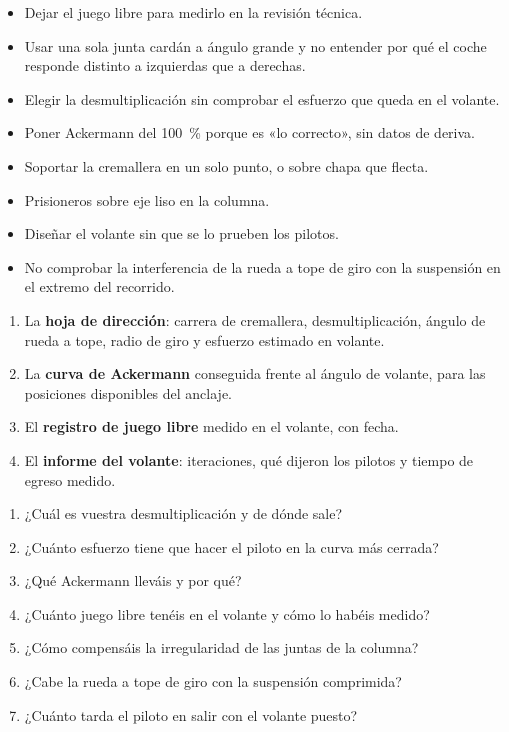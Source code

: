 \begin{ojo}
\begin{itemize}
  \item Dejar el juego libre para medirlo en la revisión técnica.
  \item Usar una sola junta cardán a ángulo grande y no entender por qué el
        coche responde distinto a izquierdas que a derechas.
  \item Elegir la desmultiplicación sin comprobar el esfuerzo que queda en el
        volante.
  \item Poner Ackermann del \SI{100}{\percent} porque es «lo correcto», sin
        datos de deriva.
  \item Soportar la cremallera en un solo punto, o sobre chapa que flecta.
  \item Prisioneros sobre eje liso en la columna.
  \item Diseñar el volante sin que se lo prueben los pilotos.
  \item No comprobar la interferencia de la rueda a tope de giro con la
        suspensión en el extremo del recorrido.
\end{itemize}
\end{ojo}

\begin{entregable}
\begin{enumerate}
  \item La \textbf{hoja de dirección}: carrera de cremallera, desmultiplicación,
        ángulo de rueda a tope, radio de giro y esfuerzo estimado en volante.
  \item La \textbf{curva de Ackermann} conseguida frente al ángulo de volante,
        para las posiciones disponibles del anclaje.
  \item El \textbf{registro de juego libre} medido en el volante, con fecha.
  \item El \textbf{informe del volante}: iteraciones, qué dijeron los pilotos y
        tiempo de egreso medido.
\end{enumerate}
\end{entregable}

\begin{juez}
\begin{enumerate}
  \item ¿Cuál es vuestra desmultiplicación y de dónde sale?
  \item ¿Cuánto esfuerzo tiene que hacer el piloto en la curva más cerrada?
  \item ¿Qué Ackermann lleváis y por qué?
  \item ¿Cuánto juego libre tenéis en el volante y cómo lo habéis medido?
  \item ¿Cómo compensáis la irregularidad de las juntas de la columna?
  \item ¿Cabe la rueda a tope de giro con la suspensión comprimida?
  \item ¿Cuánto tarda el piloto en salir con el volante puesto?
\end{enumerate}
\end{juez}
